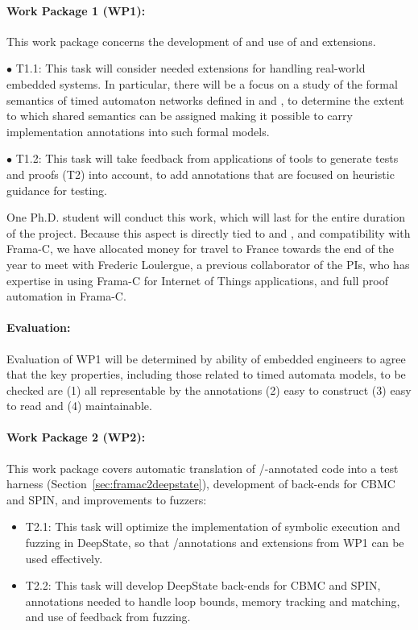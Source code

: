 \paragraph{Work Package 1 (WP1):}  This work package concerns the
development of and use of \acsl and \eacsl extensions.


$\bullet$ T1.1: This task will consider needed extensions for handling
real-world embedded systems.  In particular, there will be a focus on
a study of the formal semantics of timed
automaton networks defined in \uppaal and \prism, to determine the
extent to which shared semantics can be assigned making it possible to
carry implementation annotations into such formal models.

$\bullet$ T1.2: This task will take feedback from applications of
tools to generate tests and proofs (T2) into account, to add annotations
that are focused on heuristic guidance for testing.

One Ph.D. student will conduct this work, which will last for the
entire duration of the project.  Because this aspect is directly tied
to \acsl and \eacsl, and compatibility with Frama-C, we have allocated
money for travel to France towards the end of the year to meet with Frederic Loulergue, a previous
collaborator of the PIs, who has expertise in using Frama-C for 
Internet of Things applications, and full proof automation in Frama-C.

\paragraph{Evaluation:} Evaluation of
WP1 will be determined by ability of embedded engineers to agree that
the key properties, including those related to timed automata models, to be checked are (1) all representable by the
annotations (2) easy to construct (3) easy to read and
(4) maintainable.

\paragraph{Work Package 2 (WP2):}  This work package covers
automatic translation of \acsl/\eacsl-annotated code 
into a \deepstate test harness (Section~\ref{sec:framac2deepstate}),
development of back-ends for CBMC and SPIN, and
improvements to fuzzers:
\begin{itemize}[labelsep=3pt,leftmargin=12pt]
\item T2.1: This task will optimize the implementation of symbolic
  execution and fuzzing in DeepState, so that \acsl/\eacsl annotations
  and extensions from WP1 can be used effectively.
\item T2.2: This task will develop DeepState back-ends for CBMC and
  SPIN, annotations needed to handle loop bounds,
  memory tracking and matching, and use of feedback from fuzzing.
\end{itemize}

